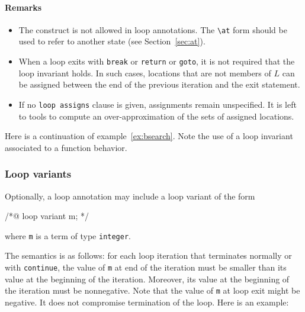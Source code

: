 \paragraph{Remarks}
\begin{itemize}
\item The \old{} construct is not allowed
  in loop annotations. The \lstinline|\at| form should be used to
  refer to another state (see Section~\ref{sec:at}).
\item When a loop exits with \lstinline{break} or \lstinline{return} or
  \lstinline{goto}, it is not required that the loop invariant holds.
  In such cases, locations that are not members of $L$ can be
  assigned between the end of the previous iteration and the exit statement.
\item If no \lstinline{loop assigns}
  clause is given, assignments remain unspecified.
  It is left to tools to compute an over-approximation of the sets
  of assigned locations.
\end{itemize}

\begin{example}
\label{ex:bsearch2}
Here is a continuation of example~\ref{ex:bsearch}. Note the use of
a loop invariant associated to a function behavior.


\end{example}

\subsubsection{Loop variants}\label{sec:loop-variant}

Optionally, a loop annotation may include a loop variant of the form
\begin{listing-nonumber}
/*@ loop variant m; */
\end{listing-nonumber}
where \lstinline|m| is a term of type \lstinline|integer|.

The semantics is as follows: for each loop iteration that terminates
normally or with \lstinline|continue|, the value of \lstinline|m| at end of the
iteration must be smaller than its value at the beginning of the
iteration. Moreover, its value at the beginning of the iteration
must be nonnegative. Note that the value of \lstinline|m| at loop exit might be
negative. It does not compromise termination of the
loop. Here is an example:

\begin{example}
  \hspace{0pt}
  \label{ex:loopvariant}
\end{example}

